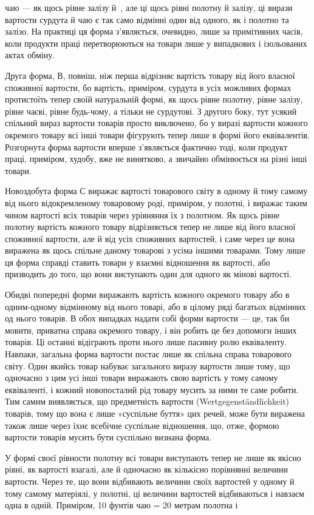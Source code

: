 \parcont{}  %
чаю — як щось рівне залізу й~, але ці щось рівні полотну
й залізу, ці вирази вартости сурдута й чаю є так само відмінні
один від одного, як і полотно та залізо. На практиці ця форма
з’являється, очевидно, лише за примітивних часів, коли продукти
праці перетворюються на товари лише у випадкових і ізольованих
актах обміну.

Друга форма, В, повніш, ніж перша відрізняє вартість товару від
його власної споживної вартости, бо вартість, приміром, сурдута
в усіх можливих формах протистоїть тепер своїй натуральній
формі, як щось рівне полотну, рівне залізу, рівне чаєві, рівне
будь-чому, а тільки не сурдутові. З другого боку, тут усякий
спільний вираз вартости товарів просто виключено, бо у виразі
вартости кожного окремого товару всі інші товари фігурують
тепер лише в формі його еквівалентів. Розгорнута форма вартости
вперше з’являється фактично тоді, коли продукт праці, приміром,
худобу, вже не винятково, а звичайно обмінюється на різні інші
товари.

Новоздобута форма С виражає вартості товарового світу в
одному й тому самому від нього відокремленому товаровому роді,
приміром, у полотні, і виражає таким чином вартості всіх товарів
через урівняння їх з полотном. Як щось рівне полотну вартість
кожного товару відрізняється тепер не лише від його власної
споживної вартости, але й від усіх споживних вартостей, і саме
через це вона виражена як щось спільне даному товарові з усіма
іншими товарами. Тому лише ця форма справді ставить товари у
взаємні відношення як вартості, або призводить до того, що вони
виступають один для одного як мінові вартості.

Обидві попередні форми виражають вартість кожного окремого
товару або в одним-одному відмінному від нього товарі, або в
цілому ряді багатьох відмінних од нього товарів. В обох випадках
надати собі форми вартости — це, так би мовити, приватна справа
окремого товару, і він робить це без допомоги інших товарів. Ці
останні відіграють проти нього лише пасивну ролю еквіваленту.
Навпаки, загальна форма вартости постає лише як спільна справа
товарового світу. Один якийсь товар набуває загального виразу
вартости лише тому, що одночасно з цим усі інші товари виражають
свою вартість у тому самому еквіваленті, і кожний новопосталий
рід товару мусить за ними те саме робити. Тим самим виявляється,
що предметність вартости (Wertgegenständlichkeit)
товарів, тому що вона є лише «суспільне буття» цих речей, може
бути виражена також лише через їхнє всебічне суспільне відношення,
що, отже, формою вартости товарів мусить бути суспільно
визнана форма.

У формі своєї рівности полотну всі товари виступають тепер
не лише як якісно рівні, як вартості взагалі, але й одночасно як
кількісно порівнянні величини вартости. Через те, що вони відбивають
величини своїх вартостей у одному й тому самому матеріялі,
у полотні, ці величини вартостей відбиваються і навзаєм
одна в одній. Приміром, 10 фунтів чаю = 20 метрам полотна і
\parbreak{}  %
